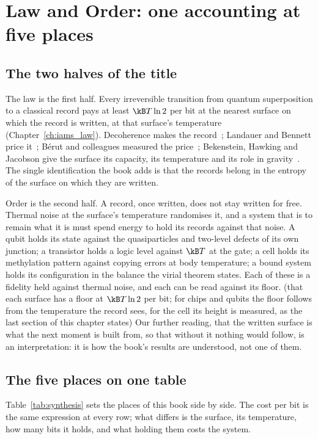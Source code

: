 \chapter{Law and Order: one accounting at five places}\label{ch:synthesis}

\section*{The two halves of the title}
The law is the first half. Every irreversible transition from quantum superposition to a classical record pays at least $\kB T\ln2$ per
bit at the nearest surface on which the record is written, at that surface's temperature (Chapter~\ref{ch:iams_law}). Decoherence makes the
record~\cite{Zurek2003}; Landauer and Bennett price it~\cite{Landauer1961,Bennett1982}; B\'erut and colleagues measured the price~\cite{Berut2012};
Bekenstein, Hawking and Jacobson give the surface its capacity, its temperature and its role in gravity~\cite{Bekenstein1973,Hawking1975,Jacobson1995}.
The single identification the book adds is that the records belong in the entropy of the surface on which they are written. \conjecture

Order is the second half. A record, once written, does not stay written for free. Thermal noise at the surface's temperature randomises it,
and a system that is to remain what it is must spend energy to hold its records against that noise. A qubit holds its state against the
quasiparticles and two-level defects of its own junction; a transistor holds a logic level against $\kB T$ at the gate; a cell holds its
methylation pattern against copying errors at body temperature; a bound system holds its configuration in the balance the virial theorem
states. Each of these is a fidelity held against thermal noise, and each can be read against its floor. \derived{} (that each surface has a
floor at $\kB T\ln2$ per bit; for chips and qubits the floor follows from the temperature the record sees, for the cell its height is
measured, as the last section of this chapter states) Our further reading,
that the written surface is what the next moment is built from, so that without it nothing would follow, is an interpretation: it is how the
book's results are understood, not one of them. \interp

\section{The five places on one table}
Table~\ref{tab:synthesis} sets the places of this book side by side. The cost per bit is the same expression at every row; what differs is the
surface, its temperature, how many bits it holds, and what holding them costs the system.


